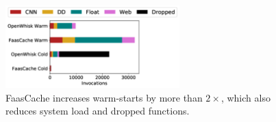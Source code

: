 %







\begin{figure}[t]
  \centering
\includegraphics[width=0.6\textwidth]{faascache/faas-keepalive-20/graphs/litmus_tests/faasbench_48_cold_hot-legend.pdf}
\caption{FaasCache increases warm-starts by more than $2\times$, which also reduces system load and dropped functions.}
\label{fig:faasbench}
\end{figure}


